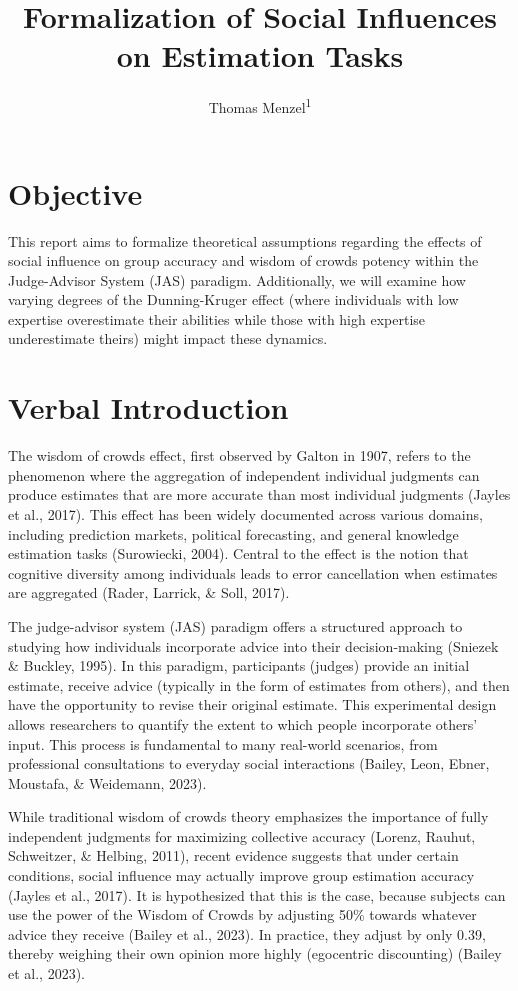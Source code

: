 \documentclass[
  man,floatsintext]{apa6}
\title{Formalization of Social Influences on Estimation Tasks}
\author{Thomas Menzel\textsuperscript{1}}
\date{}
\affiliation{\vspace{0.5cm}\textsuperscript{1} Ludwig-Maximilians Universität München}
\begin{document}
\maketitle

\hypertarget{objective}{%
\section{Objective}\label{objective}}

This report aims to formalize theoretical assumptions regarding the effects of social influence on group accuracy and wisdom of crowds potency within the Judge-Advisor System (JAS) paradigm. Additionally, we will examine how varying degrees of the Dunning-Kruger effect (where individuals with low expertise overestimate their abilities while those with high expertise underestimate theirs) might impact these dynamics.

\hypertarget{verbal-introduction}{%
\section{Verbal Introduction}\label{verbal-introduction}}

The wisdom of crowds effect, first observed by Galton in 1907, refers to the phenomenon where the aggregation of independent individual judgments can produce estimates that are more accurate than most individual judgments (Jayles et al., 2017). This effect has been widely documented across various domains, including prediction markets, political forecasting, and general knowledge estimation tasks (Surowiecki, 2004). Central to the effect is the notion that cognitive diversity among individuals leads to error cancellation when estimates are aggregated (Rader, Larrick, \& Soll, 2017).

The judge-advisor system (JAS) paradigm offers a structured approach to studying how individuals incorporate advice into their decision-making (Sniezek \& Buckley, 1995). In this paradigm, participants (judges) provide an initial estimate, receive advice (typically in the form of estimates from others), and then have the opportunity to revise their original estimate. This experimental design allows researchers to quantify the extent to which people incorporate others' input. This process is fundamental to many real-world scenarios, from professional consultations to everyday social interactions (Bailey, Leon, Ebner, Moustafa, \& Weidemann, 2023).

While traditional wisdom of crowds theory emphasizes the importance of fully independent judgments for maximizing collective accuracy (Lorenz, Rauhut, Schweitzer, \& Helbing, 2011), recent evidence suggests that under certain conditions, social influence may actually improve group estimation accuracy (Jayles et al., 2017). It is hypothesized that this is the case, because subjects can use the power of the Wisdom of Crowds by adjusting 50\% towards whatever advice they receive (Bailey et al., 2023). In practice, they adjust by only 0.39, thereby weighing their own opinion more highly (egocentric discounting) (Bailey et al., 2023).
\end{document}

